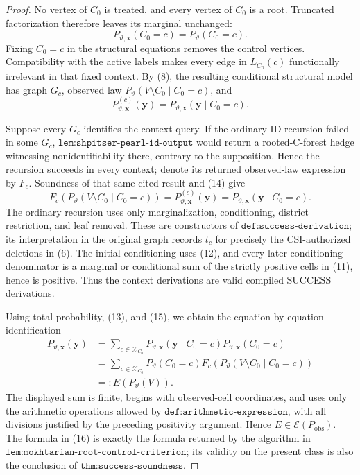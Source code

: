 \documentclass{article}
\begin{document}
\begin{proof}
No vertex of \(C_0\) is treated, and every vertex of \(C_0\) is a root.  Truncated factorization therefore leaves its marginal unchanged:
\[
P_{\vartheta,\mathbf x}(C_0=c)=P_\vartheta(C_0=c).
\tag{13}
\]
Fixing \(C_0=c\) in the structural equations removes the control vertices.  Compatibility with the active labels makes every edge in \(L_{C_0}(c)\) functionally irrelevant in that fixed context.  By (8), the resulting conditional structural model has graph \(G_c\), observed law \(P_\vartheta(V\setminus C_0\mid C_0=c)\), and
\[
P^{(c)}_{\vartheta,\mathbf x}(\mathbf y)
=P_{\vartheta,\mathbf x}(\mathbf y\mid C_0=c).
\tag{14}
\]

Suppose every \(G_c\) identifies the context query.  If the ordinary \(\mathrm{ID}\) recursion failed in some \(G_c\), \(\texttt{lem:shpitser-pearl-id-output}\) would return a rooted-C-forest hedge witnessing nonidentifiability there, contrary to the supposition.  Hence the recursion succeeds in every context; denote its returned observed-law expression by \(F_c\).  Soundness of that same cited result and (14) give
\[
F_c\!\left(P_\vartheta(V\setminus C_0\mid C_0=c)\right)
=P^{(c)}_{\vartheta,\mathbf x}(\mathbf y)
=P_{\vartheta,\mathbf x}(\mathbf y\mid C_0=c).
\tag{15}
\]
The ordinary recursion uses only marginalization, conditioning, district restriction, and leaf removal.  These are constructors of \(\texttt{def:success-derivation}\); its interpretation in the original graph records \(t_c\) for precisely the CSI-authorized deletions in (6).  The initial conditioning uses (12), and every later conditioning denominator is a marginal or conditional sum of the strictly positive cells in (11), hence is positive.  Thus the context derivations are valid compiled SUCCESS derivations.

Using total probability, (13), and (15), we obtain the equation-by-equation identification
\[
\begin{aligned}
P_{\vartheta,\mathbf x}(\mathbf y)
&=\sum_{c\in\mathcal X_{C_0}}
  P_{\vartheta,\mathbf x}(\mathbf y\mid C_0=c)
  P_{\vartheta,\mathbf x}(C_0=c)\\
&=\sum_{c\in\mathcal X_{C_0}}
  P_\vartheta(C_0=c)
  F_c\!\left(P_\vartheta(V\setminus C_0\mid C_0=c)\right)\\
&=:E(P_\vartheta(V)).
\end{aligned}
\tag{16}
\]
The displayed sum is finite, begins with observed-cell coordinates, and uses only the arithmetic operations allowed by \(\texttt{def:arithmetic-expression}\), with all divisions justified by the preceding positivity argument.  Hence \(E\in\mathscr E(P_{\mathrm{obs}})\).  The formula in (16) is exactly the formula returned by the algorithm in \(\texttt{lem:mokhtarian-root-control-criterion}\); its validity on the present class is also the conclusion of \(\texttt{thm:success-soundness}\).


\end{proof}
\end{document}
